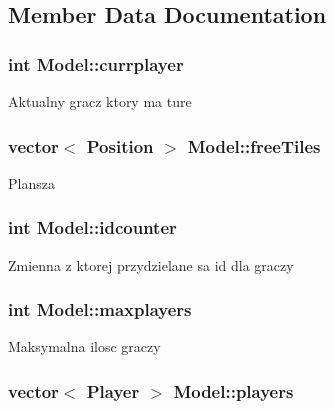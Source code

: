\subsection{Member Data Documentation}
\hypertarget{classModel_a882710d0512c34c6b9b385c8d76825cb}{
\subsubsection[{currplayer}]{\setlength{\rightskip}{0pt plus 5cm}int Model\-::currplayer}}\label{classModel_a882710d0512c34c6b9b385c8d76825cb}
Aktualny gracz ktory ma ture \hypertarget{classModel_a082090abc6b22e3bb5354f892417c444}{
\subsubsection[{free\-Tiles}]{\setlength{\rightskip}{0pt plus 5cm}vector$<$ {\bf Position} $>$ Model\-::free\-Tiles}}\label{classModel_a082090abc6b22e3bb5354f892417c444}
Plansza \hypertarget{classModel_addac0dda85cc75450345d300c48ff276}{
\subsubsection[{idcounter}]{\setlength{\rightskip}{0pt plus 5cm}int Model\-::idcounter}}\label{classModel_addac0dda85cc75450345d300c48ff276}
Zmienna z ktorej przydzielane sa id dla graczy \hypertarget{classModel_aa90bb7e95e18111d59df116fcabbdd89}{
\subsubsection[{maxplayers}]{\setlength{\rightskip}{0pt plus 5cm}int Model\-::maxplayers}}\label{classModel_aa90bb7e95e18111d59df116fcabbdd89}
Maksymalna ilosc graczy \hypertarget{classModel_ae426f6b24893143e51e626a3026938ec}{
\subsubsection[{players}]{\setlength{\rightskip}{0pt plus 5cm}vector$<$ {\bf Player} $>$ Model\-::players}}\label{classModel_ae426f6b24893143e51e626a3026938ec}
